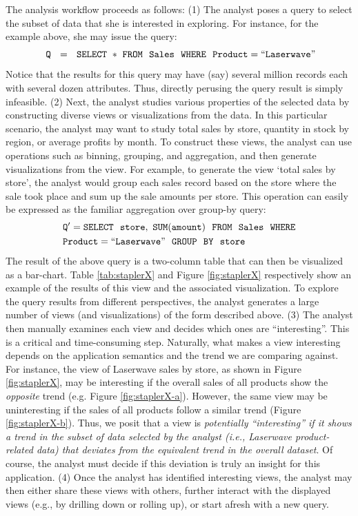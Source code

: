 The analysis workflow proceeds as follows:
(1) The analyst poses a query to select the subset of data that she is
interested in exploring.
For instance, for the example above, she may issue the query:
\noindent $${\tt \ Q \ \ = \ \ SELECT \ * \ FROM \ \  Sales \ \ WHERE \ \
Product=``Laserwave"} $$ \noindent Notice that the results for this query may
have (say) several million records each with several dozen attributes.
Thus, directly perusing the query result is simply infeasible.
(2) Next, the analyst studies various properties of the selected data by
constructing diverse views or visualizations from the data. In this particular
scenario, the analyst may want to study total sales by store, quantity in stock
by region, or average profits by month. To construct these views, the analyst
can use operations such as binning, grouping, and aggregation, and then generate
visualizations from the view. For example, to generate the view `total sales by
store', the analyst would group each sales record based on the store where the
sale took place and sum up the sale amounts per store. This operation can easily
be expressed as the familiar aggregation over group-by query:
\noindent
\begin{align*}
& \tt Q' = SELECT \ \ store,\ SUM(amount) \ \ FROM \ \  Sales \ \ WHERE \\
& \tt Product=``Laserwave" \ \ GROUP  \ \ BY \ \ store
\end{align*}
The result of the above query is a two-column table that can then be visualized
as a bar-chart. Table \ref{tab:staplerX} and Figure
\ref{fig:staplerX} respectively show an example of the results of this view and
the associated visualization.
To explore the query results from different perspectives, the analyst generates
a large number of views (and visualizations) of the form described above.
(3) The analyst then manually examines each view and decides
which ones are ``interesting''. This is a critical and time-consuming step.
Naturally, what makes a view interesting depends on the 
application semantics and the trend we are comparing against.
For instance, the view of Laserwave sales by store, as shown in Figure
\ref{fig:staplerX}, may be interesting if the overall sales of all products show
the {\it opposite} trend (e.g. Figure \ref{fig:staplerX-a}). However, the same
view may be uninteresting if the sales of all products follow a similar trend (Figure \ref{fig:staplerX-b}).
Thus, we posit that  a view is {\em potentially ``interesting'' if it shows 
a trend in the subset of data selected by the analyst
(i.e., Laserwave product-related data)
that deviates from the equivalent trend in the overall dataset}.
Of course, the analyst must decide if this deviation 
is truly an insight for this application.
(4) Once the analyst has identified interesting views, the analyst may
then either share these views with others, further interact with
the displayed views (e.g., by drilling down or rolling up), or
start afresh with a new query.


